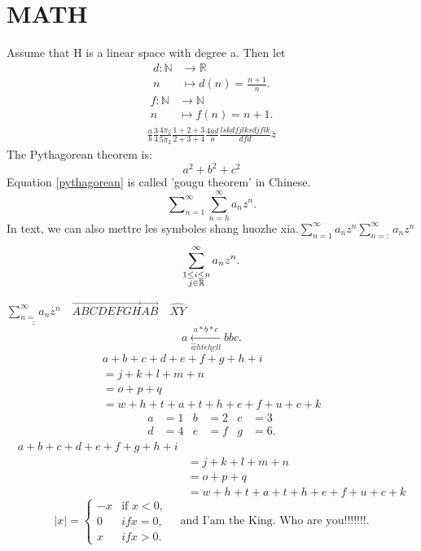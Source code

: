 \documentclass[11pt,oneside,a4paper]{article}
\begin{document}
\section{MATH}
Assume that H is a linear space with degree a. Then let \begin{align*}
	d: \mathbb{N} &\longrightarrow \mathbb{R} \\
	 n&\longmapsto d(n) = \frac{n+1}{n} 
.\end{align*}
\begin{align*}
	f: \mathbb{N} &\longrightarrow \mathbb{N} \\
	n &\longmapsto f(n) = n+1
.\end{align*}
\begin{align}
	\frac{a}{b}
	\frac{3}{4}
	\frac{4\pi_2}{5\pi_2}
	\frac{1+2+3}{2+3+4}
	\frac{4ad}{o}
	\frac{lskdfjlksdjflk}{dfd}	
	\overline{z}
\end{align}
The Pythagorean theorem is:
\begin{equation}
	a^{2}+b^{2}+c^{2} \label{pythagorean} %
\end{equation}
Equation \eqref{pythagorean} is called 'gougu theorem' in Chinese.
\[
\sum\nolimits_{n=1}^{\infty} \sum_{n=h}^{\infty} a_n z^n
.\] 
In text, we can also mettre les symboles shang huozhe xia.$\sum\limits_{n=1}^{\infty} a_n z^n \sum_{n=:}^{\infty} a_n z^n$
\[
\sum_{
\begin{subarray}{c}
	1 \le i \le n\\
	j \in \mathbb{R}
\end{subarray}
}^{\infty} a_n z^n
.\] 

$\underline{\underline{\sum_{n=}^{\infty} a_n z^n}}\quad \overrightarrow{ABCDEFGH} \overrightarrow{AB}\quad \widehat{XY}$
\[
a\xleftarrow[\hat{w} hte hell]{a*b*c}bbc
.\] 
\[
.\] 
\begin{multline}
	a+b+c+d+e+f+g+h+i\\
	= j+k+l+m+n\\
	= o+p+q\\
	= w +h +t+a+t+h+e+f+u+c+k
\end{multline}
\begin{align*}
	a &= 1 & b &= 2 & c &= 3\\
	d &= 4 & e &= f & g &= 6
.\end{align*}
\begin{equation}
\begin{aligned}
	a+b+c+d+e+f+g+h+i\\
	&= j+k+l+m+n\\
	&= o+p+q\\
	&= w +h +t+a+t+h+e+f+u+c+k
\end{aligned}
\end{equation}
\[
|x|=
\begin{cases}
	-x & \text{if } x < 0,\\
	0 & if x = 0,\\
	x & if x > 0.
\end{cases}
\quad\text{and I'am the King. Who are you!!!!!!!}
.\] 
\end{document}
